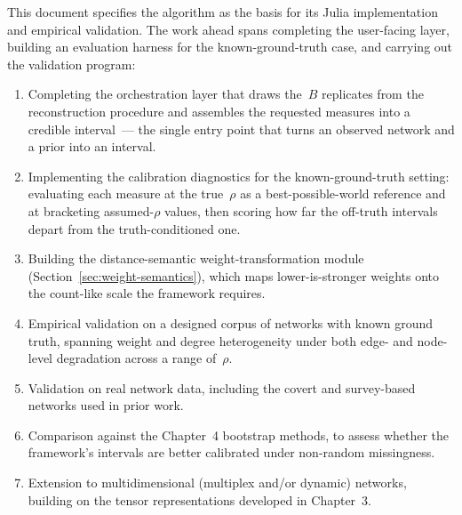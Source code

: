 \documentclass[11pt]{article}
\begin{document}
This document specifies the algorithm as the basis for its Julia implementation and empirical validation. The work ahead spans completing the user-facing layer, building an evaluation harness for the known-ground-truth case, and carrying out the validation program:
\begin{enumerate}[leftmargin=*, itemsep=2pt]
  \item Completing the orchestration layer that draws the~$B$ replicates from the reconstruction procedure and assembles the requested measures into a credible interval~--- the single entry point that turns an observed network and a prior into an interval.
  \item Implementing the calibration diagnostics for the known-ground-truth setting: evaluating each measure at the true~$\rho$ as a best-possible-world reference and at bracketing assumed-$\rho$ values, then scoring how far the off-truth intervals depart from the truth-conditioned one.
  \item Building the distance-semantic weight-transformation module (Section~\ref{sec:weight-semantics}), which maps lower-is-stronger weights onto the count-like scale the framework requires.
  \item Empirical validation on a designed corpus of networks with known ground truth, spanning weight and degree heterogeneity under both edge- and node-level degradation across a range of~$\rho$.
  \item Validation on real network data, including the covert and survey-based networks used in prior work.
  \item Comparison against the Chapter~4 bootstrap methods, to assess whether the framework's intervals are better calibrated under non-random missingness.
  \item Extension to multidimensional (multiplex and/or dynamic) networks, building on the tensor representations developed in Chapter~3.
\end{enumerate}



\end{document}
